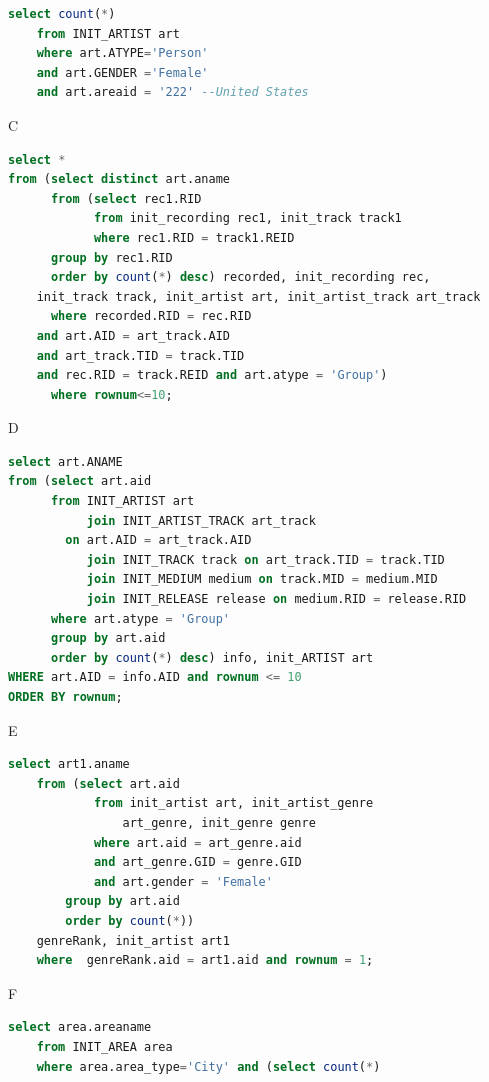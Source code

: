 \documentclass[11pt]{article} %
\begin{document}
{\begin{lstlisting}[language=SQL, keywordstyle=\color{blue!70},
commentstyle=\color{red!50!green!50!blue!50},
rulesepcolor=\color{red!20!green!20!blue!20},
frame=shadowbox]
select count(*)
	from INIT_ARTIST art
	where art.ATYPE='Person'
	and art.GENDER ='Female'
	and art.areaid = '222' --United States
\end{lstlisting}
C
\begin{lstlisting}[language=SQL, keywordstyle=\color{blue!70},
commentstyle=\color{red!50!green!50!blue!50},
rulesepcolor=\color{red!20!green!20!blue!20},
frame=shadowbox]
select *
from (select distinct art.aname
      from (select rec1.RID
            from init_recording rec1, init_track track1
            where rec1.RID = track1.REID 
      group by rec1.RID
      order by count(*) desc) recorded, init_recording rec,
	init_track track, init_artist art, init_artist_track art_track
      where recorded.RID = rec.RID
	and art.AID = art_track.AID
	and art_track.TID = track.TID 
	and rec.RID = track.REID and art.atype = 'Group')
      where rownum<=10;
\end{lstlisting}
D
\begin{lstlisting}[language=SQL, keywordstyle=\color{blue!70},
commentstyle=\color{red!50!green!50!blue!50},
rulesepcolor=\color{red!20!green!20!blue!20},
frame=shadowbox]
select art.ANAME
from (select art.aid
      from INIT_ARTIST art 
           join INIT_ARTIST_TRACK art_track
		on art.AID = art_track.AID
           join INIT_TRACK track on art_track.TID = track.TID
           join INIT_MEDIUM medium on track.MID = medium.MID
           join INIT_RELEASE release on medium.RID = release.RID
      where art.atype = 'Group'
      group by art.aid
      order by count(*) desc) info, init_ARTIST art
WHERE art.AID = info.AID and rownum <= 10
ORDER BY rownum;
\end{lstlisting}
E
\begin{lstlisting}[language=SQL, keywordstyle=\color{blue!70},
commentstyle=\color{red!50!green!50!blue!50},
rulesepcolor=\color{red!20!green!20!blue!20},
frame=shadowbox]
select art1.aname
	from (select art.aid
			from init_artist art, init_artist_genre
				art_genre, init_genre genre
			where art.aid = art_genre.aid
			and art_genre.GID = genre.GID
			and art.gender = 'Female' 
		group by art.aid
		order by count(*))
	genreRank, init_artist art1
	where  genreRank.aid = art1.aid and rownum = 1;
\end{lstlisting}
F
\begin{lstlisting}[language=SQL, keywordstyle=\color{blue!70},
commentstyle=\color{red!50!green!50!blue!50},
rulesepcolor=\color{red!20!green!20!blue!20},
frame=shadowbox]
select area.areaname
	from INIT_AREA area
	where area.area_type='City' and (select count(*)

\end{lstlisting}}
\end{document}
